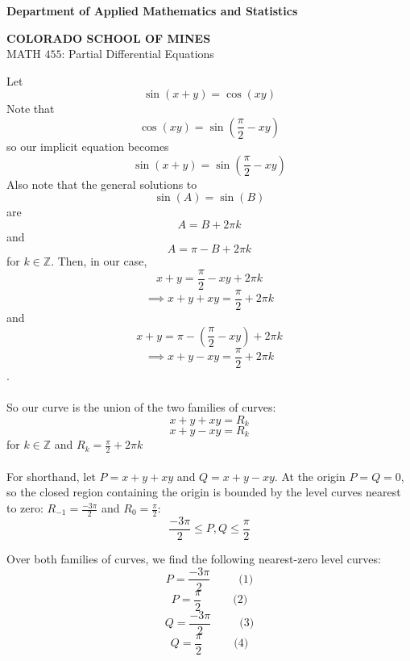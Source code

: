 \documentclass[12pt]{article}
\begin{document}
\begin{flushleft}

\textbf{Department of Applied Mathematics and Statistics}

\textbf{COLORADO SCHOOL OF MINES}\\


MATH $455$: Partial Differential Equations
\end{flushleft}

Let $$\sin(x+y) = \cos(xy)$$ Note that $$\cos(xy) = \sin(\frac{\pi}{2} - xy)$$ so our implicit equation becomes $$\sin(x+y) = \sin(\frac{\pi}{2} - xy)$$ Also note that the general solutions to $$\sin(A) = \sin(B)$$ are $$A = B + 2\pi k$$ and $$A = \pi - B + 2\pi k$$ for $k \in \mathbb{Z}$. Then, in our case, $$x + y = \frac{\pi}{2} - xy + 2\pi k$$ $$\implies x + y + xy = \frac{\pi}{2} + 2\pi k$$ and $$x + y = \pi - (\frac{\pi}{2} - xy) + 2\pi k$$ $$\implies x + y - xy = \frac{\pi}{2} + 2\pi k$$. \\ \\ So our curve is the union of the two families of curves: $$x + y + xy = R_k$$ $$x + y - xy = R_k$$ for $k \in \mathbb{Z}$ and $R_k = \frac{\pi}{2} + 2\pi k$ \\ \\
For shorthand, let $P = x + y + xy$ and $Q = x + y - xy$. At the origin $P=Q=0$, so the closed region containing the origin is bounded by the level curves nearest to zero: $R_{-1} = \frac{-3\pi}{2}$ and $R_{0} = \frac{\pi}{2}$: $$\frac{-3\pi}{2} \leq P,Q \leq \frac{\pi}{2}$$

Over both families of curves, we find the following nearest-zero level curves:
$$P = \frac{-3\pi}{2} \;\;\;\;\;\;\;\;\; \text{(1)}$$
$$P = \frac{\pi}{2} \;\;\;\;\;\;\;\;\;\; \text{(2)}$$
$$Q = \frac{-3\pi}{2} \;\;\;\;\;\;\;\;\; \text{(3)}$$
$$Q = \frac{\pi}{2} \;\;\;\;\;\;\;\;\;\; \text{(4)}$$
\end{document}
